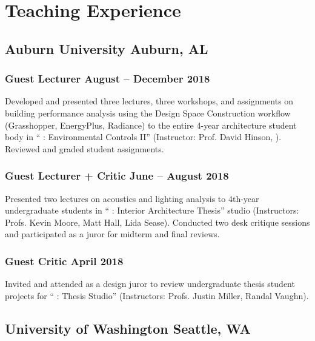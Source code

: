 \documentclass[letterpaper, oneside, 10pt]{article}
\begin{document}
\suppresstrue


\section*{Teaching Experience} %

\hfill
\vspace{-25pt}


\subsection*{Auburn University\DotSep{0.25em} Auburn, AL}


\subsubsection*{Guest Lecturer\DotSep{0.25em} August -- December 2018}

Developed and presented three lectures, three workshops, and assignments on
building performance analysis using the Design Space Construction workflow
(Grasshopper, EnergyPlus, Radiance) to the entire 4-year architecture
student body in `` : Environmental Controls II” (Instructor:
Prof. David Hinson, ). Reviewed and graded student assignments.


\subsubsection*{Guest Lecturer + Critic\DotSep{0.25em} June – August 2018}

Presented two lectures on acoustics and lighting analysis to 4th-year
undergraduate students in `` : Interior Architecture
Thesis'' studio (Instructors: Profs. Kevin Moore, Matt Hall, Lida Sease).
Conducted two desk critique sessions and participated as a juror for midterm
and final reviews.


\subsubsection*{Guest Critic\DotSep{0.25em} April 2018}

Invited and attended as a design juror to review undergraduate thesis student
projects for `` : Thesis Studio'' (Instructors: Profs. Justin
Miller, Randal Vaughn).


\subsection*{University of Washington\DotSep{0.25em} Seattle, WA}
\end{document}
